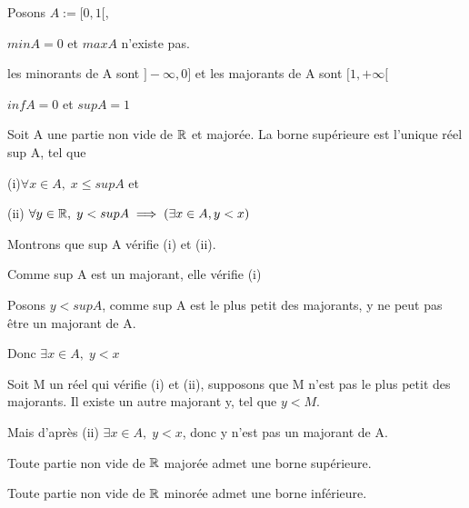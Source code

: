 \documentclass[a4paper, 12pt]{article}
\begin{document}
\begin{example}
    Posons $A := [0, 1[$,

    $min A = 0$ et $max A$ n'existe pas.

    les minorants de A sont $]-\infty, 0]$ et les majorants de A sont $[1, +\infty[$
    
    $inf A = 0$ et $sup A = 1$
\end{example}

\begin{proposition}
    Soit A une partie non vide de $\mathbb{R}$ et majorée. La borne supérieure est l'unique réel sup A, tel que
    
    \item (i)$\forall x \in A, \; x \leq sup A$ et
    \item (ii) $\forall y \in \mathbb{R}, \; y < sup A \implies (\exists x \in A, y < x)$
\end{proposition}

\begin{demonstration}
    Montrons que sup A vérifie (i) et (ii).

    \begin{rdem}
        Comme sup A est un majorant, elle vérifie (i)
    \end{rdem}

    Posons $y \lt sup A$, comme sup A est le plus petit des majorants, y ne peut pas être un majorant de A.
    
    \begin{rdem}
        Donc $\exists x \in A, \; y < x$
    \end{rdem}

    Soit M un réel qui vérifie (i) et (ii), supposons que M n'est pas le plus petit des majorants.
    Il existe un autre majorant y, tel que $y \lt M$.

    \begin{rdem}
        Mais d'après (ii) $\exists x \in A, \; y < x$, donc y n'est pas un majorant de A.
    \end{rdem}
\end{demonstration}

\begin{theorem}
    Toute partie non vide de $\mathbb{R}$ majorée admet une borne supérieure.
\end{theorem}

\begin{theorem}
    Toute partie non vide de $\mathbb{R}$ minorée admet une borne inférieure.
\end{theorem}
\end{document}
